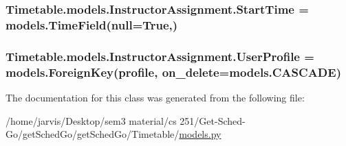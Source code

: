 \subsubsection[{\texorpdfstring{Start\+Time}{StartTime}}]{\setlength{\rightskip}{0pt plus 5cm}Timetable.\+models.\+Instructor\+Assignment.\+Start\+Time = models.\+Time\+Field(null=True,)\hspace{0.3cm}{\ttfamily [static]}}\hypertarget{classTimetable_1_1models_1_1InstructorAssignment_a3f4edc7224eef181116da64d9fb3e833}{}\label{classTimetable_1_1models_1_1InstructorAssignment_a3f4edc7224eef181116da64d9fb3e833}
\subsubsection[{\texorpdfstring{User\+Profile}{UserProfile}}]{\setlength{\rightskip}{0pt plus 5cm}Timetable.\+models.\+Instructor\+Assignment.\+User\+Profile = models.\+Foreign\+Key({\bf profile}, on\+\_\+delete=models.\+C\+A\+S\+C\+A\+DE)\hspace{0.3cm}{\ttfamily [static]}}\hypertarget{classTimetable_1_1models_1_1InstructorAssignment_a64f231cb4bd0aa520af50783b061152b}{}\label{classTimetable_1_1models_1_1InstructorAssignment_a64f231cb4bd0aa520af50783b061152b}


The documentation for this class was generated from the following file\+:\begin{DoxyCompactItemize}
\item 
/home/jarvis/\+Desktop/sem3 material/cs 251/\+Get-\/\+Sched-\/\+Go/get\+Sched\+Go/get\+Sched\+Go/\+Timetable/\hyperlink{Timetable_2models_8py}{models.\+py}\end{DoxyCompactItemize}
